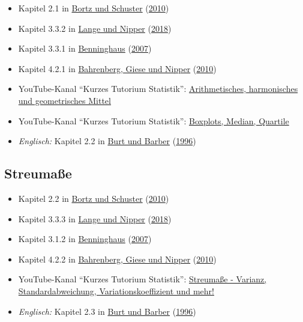 \documentclass[
  11pt,
  ngerman,
  a4paper,
]{report}
\providecommand{\tightlist}{%
  \setlength{\itemsep}{0pt}\setlength{\parskip}{0pt}}
\begin{document}
\begin{itemize}
\tightlist
\item
  Kapitel 2.1 in \protect\hyperlink{ref-bortz}{Bortz und Schuster} (\protect\hyperlink{ref-bortz}{2010})
\item
  Kapitel 3.3.2 in \protect\hyperlink{ref-delange}{Lange und Nipper} (\protect\hyperlink{ref-delange}{2018})
\item
  Kapitel 3.3.1 in \protect\hyperlink{ref-benninghaus}{Benninghaus} (\protect\hyperlink{ref-benninghaus}{2007})
\item
  Kapitel 4.2.1 in \protect\hyperlink{ref-bahrenberg}{Bahrenberg, Giese und Nipper} (\protect\hyperlink{ref-bahrenberg}{2010})
\item
  YouTube-Kanal \enquote{Kurzes Tutorium Statistik}: \href{https://www.youtube.com/watch?v=Kx9aHOMVPEg}{Arithmetisches, harmonisches und geometrisches Mittel}
\item
  YouTube-Kanal \enquote{Kurzes Tutorium Statistik}: \href{https://www.youtube.com/watch?v=HsDeAoBOyS4}{Boxplots, Median, Quartile}
\item
  \emph{Englisch:} Kapitel 2.2 in \protect\hyperlink{ref-burt}{Burt und Barber} (\protect\hyperlink{ref-burt}{1996})
\end{itemize}

\hypertarget{streumauxdfe-1}{%
\subsection{Streumaße}\label{streumauxdfe-1}}

\begin{itemize}
\tightlist
\item
  Kapitel 2.2 in \protect\hyperlink{ref-bortz}{Bortz und Schuster} (\protect\hyperlink{ref-bortz}{2010})
\item
  Kapitel 3.3.3 in \protect\hyperlink{ref-delange}{Lange und Nipper} (\protect\hyperlink{ref-delange}{2018})
\item
  Kapitel 3.1.2 in \protect\hyperlink{ref-benninghaus}{Benninghaus} (\protect\hyperlink{ref-benninghaus}{2007})
\item
  Kapitel 4.2.2 in \protect\hyperlink{ref-bahrenberg}{Bahrenberg, Giese und Nipper} (\protect\hyperlink{ref-bahrenberg}{2010})
\item
  YouTube-Kanal \enquote{Kurzes Tutorium Statistik}: \href{https://www.youtube.com/watch?v=3oZrS3ZWVcA}{Streumaße - Varianz, Standardabweichung, Variationskoeffizient und mehr!}
\item
  \emph{Englisch:} Kapitel 2.3 in \protect\hyperlink{ref-burt}{Burt und Barber} (\protect\hyperlink{ref-burt}{1996})
\end{itemize}
\end{document}
